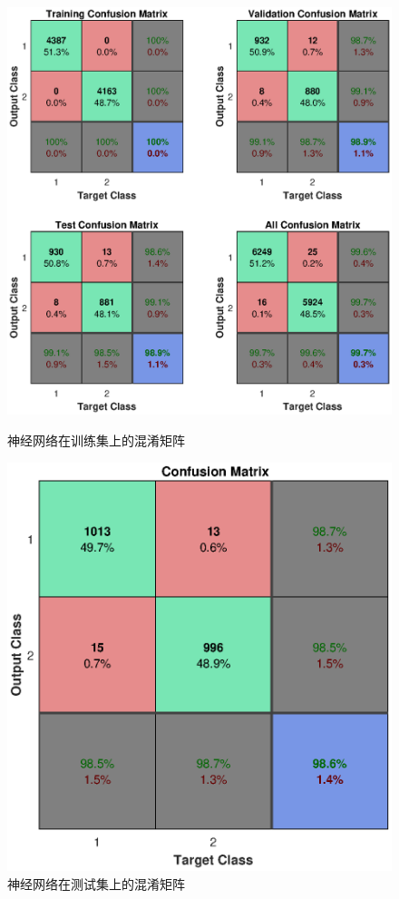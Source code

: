 \documentclass[UTF8,a4paper]{ctexart}
\begin{document}
\begin{figure}
\centering 
\includegraphics[width=\textwidth]{NNconfi.eps}
\caption{神经网络在训练集上的混淆矩阵}
\label{NN}
\includegraphics[width=\textwidth]{NNTconfu.eps}
\caption{神经网络在测试集上的混淆矩阵}
\label{TNN}
\end{figure}
\end{document}
